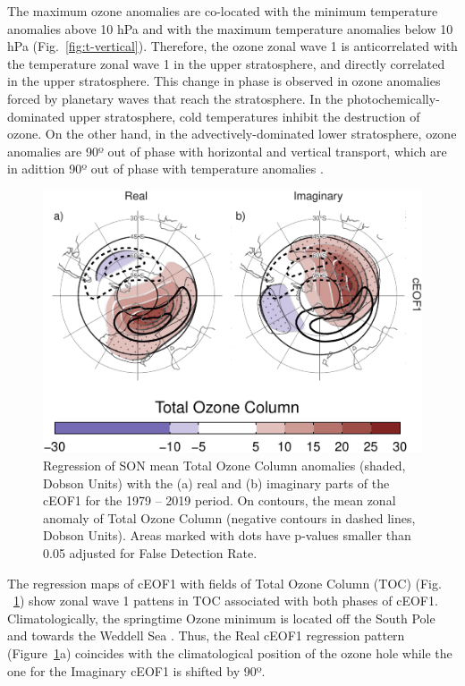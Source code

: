 \documentclass[smallextended]{svjour3}       %
\begin{document}
The maximum ozone anomalies are co-located with the minimum temperature anomalies above 10 hPa and with the maximum temperature anomalies below 10 hPa (Fig.~\ref{fig:t-vertical}). Therefore, the ozone zonal wave 1 is anticorrelated with the temperature zonal wave 1 in the upper stratosphere, and directly correlated in the upper stratosphere. This change in phase is observed in ozone anomalies forced by planetary waves that reach the stratosphere. In the photochemically-dominated upper stratosphere, cold temperatures inhibit the destruction of ozone. On the other hand, in the advectively-dominated lower stratosphere, ozone anomalies are 90º out of phase with horizontal and vertical transport, which are in adittion 90º out of phase with temperature anomalies \citep{hartmann1979, wirth1993, smith1995}.



\begin{figure}
\centering
\includegraphics{../figures/o3-regr-1.pdf}
\caption{\label{fig:o3-regr}Regression of SON mean Total Ozone Column anomalies (shaded, Dobson Units) with the (a) real and (b) imaginary parts of the cEOF1 for the 1979 -- 2019 period. On contours, the mean zonal anomaly of Total Ozone Column (negative contours in dashed lines, Dobson Units). Areas marked with dots have p-values smaller than 0.05 adjusted for False Detection Rate.}
\end{figure}

The regression maps of cEOF1 with fields of Total Ozone Column (TOC) (Fig. ~\ref{fig:o3-regr}) show zonal wave 1 pattens in TOC associated with both phases of cEOF1. Climatologically, the springtime Ozone minimum is located off the South Pole and towards the Weddell Sea \citep{grytsai2011}.
Thus, the Real cEOF1 regression pattern (Figure~\ref{fig:o3-regr}a) coincides with the climatological position of the ozone hole while the one for the Imaginary cEOF1 is shifted by 90º.
\end{document}

